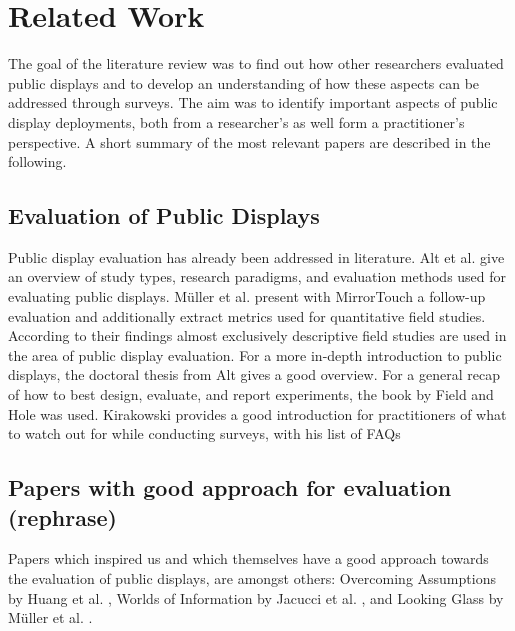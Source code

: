\section{Related Work}
\label{chapter:related-work}

	The goal of the literature review was to find out how other researchers evaluated public displays and to develop an understanding of how these aspects can be addressed through surveys. The aim was to identify important aspects of public display deployments, both from a researcher's as well form a practitioner's perspective. A short summary of the most relevant papers are described in the following.


	\subsection{Evaluation of Public Displays} %

	Public display evaluation has already been addressed in literature. Alt et al. \cite{Alt2012HowToEvaluate} give an overview of study types, research paradigms, and evaluation methods used for evaluating public displays. M{\"u}ller et al. \cite{muller2014mirrortouch} present with MirrorTouch a follow-up evaluation and additionally extract metrics used for quantitative field studies. According to their findings almost exclusively descriptive field studies are used in the area of public display evaluation. For a more in-depth introduction to public displays, the doctoral thesis from Alt \cite{alt2013thesis} gives a good overview.
	For a general recap of how to best design, evaluate, and report experiments, the book by Field and Hole \cite{field2003design} was used. Kirakowski \cite{kirakowski2000questionnaireFAQ} provides a good introduction for practitioners of what to watch out for while conducting surveys, with his list of FAQs




	\subsection{Papers with good approach for evaluation (rephrase)}

	Papers which inspired us and which themselves have a good approach towards the evaluation of public displays, are amongst others: Overcoming Assumptions by Huang et al. \cite{huang2008overcoming}, Worlds of Information by Jacucci et al. \cite{jacucci2010worldsofinformation}, and Looking Glass by M{\"u}ller et al. \cite{Muller2012LookingGlass}. 


